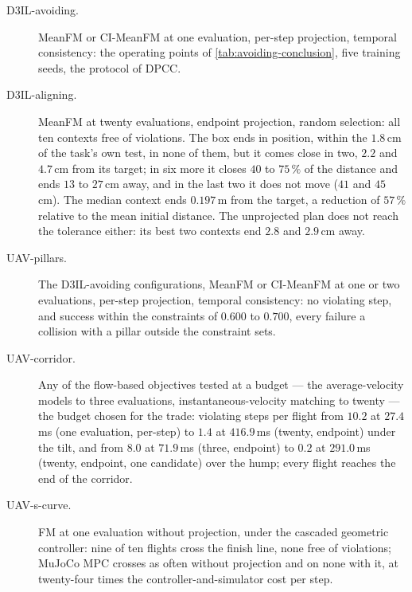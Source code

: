 \begin{description}
  \item[D3IL-avoiding.] MeanFM or CI-MeanFM at one evaluation, per-step projection, temporal consistency:
    the operating points of \autoref{tab:avoiding-conclusion}, five training seeds, the protocol of \ac{DPCC}.
  \item[D3IL-aligning.] MeanFM at twenty evaluations, endpoint projection, random selection: all ten contexts
    free of violations. The box ends in position, within the $1.8$\,cm of the task's own test, in none of
    them, but it comes close in two, $2.2$ and $4.7$\,cm from its target; in six more it closes $40$ to
    $75\,\%$ of the distance and ends $13$ to $27$\,cm away, and in the last two it does not move ($41$ and
    $45$\,cm). The median context ends $0.197$\,m from the target, a reduction of $57\,\%$ relative to the mean initial
    distance.
    The unprojected plan does not reach the tolerance either: its best two contexts end $2.8$ and $2.9$\,cm
    away.
  \item[UAV-pillars.] The D3IL-avoiding configurations, MeanFM or CI-MeanFM at one or two evaluations,
    per-step projection, temporal consistency: no violating step, and success within the constraints of
    $0.600$ to $0.700$, every failure a collision with a pillar outside the constraint sets.
  \item[UAV-corridor.] Any of the flow-based objectives tested at a budget --- the average-velocity models to
    three evaluations, instantaneous-velocity matching to twenty --- the budget chosen for the trade:
    violating steps per flight
    from $10.2$ at $27.4$\,ms (one evaluation, per-step) to $1.4$ at $416.9$\,ms (twenty, endpoint) under the
    tilt, and from $8.0$ at $71.9$\,ms (three, endpoint) to $0.2$ at $291.0$\,ms (twenty, endpoint, one
    candidate) over the hump; every flight reaches the end of the corridor.
  \item[UAV-s-curve.] FM at one evaluation without projection, under the cascaded geometric controller: nine
    of ten flights cross the finish line, none free of violations; MuJoCo MPC crosses as often without
    projection and on none with it, at twenty-four times the controller-and-simulator cost per step.
\end{description}
